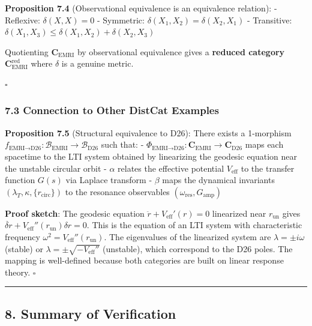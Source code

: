 \documentclass[
]{article}
\begin{document}
\textbf{Proposition 7.4} (Observational equivalence is an equivalence
relation): - Reflexive: \(\delta(X, X) = 0\) - Symmetric:
\(\delta(X_1, X_2) = \delta(X_2, X_1)\) - Transitive:
\(\delta(X_1, X_3) \leq \delta(X_1, X_2) + \delta(X_2, X_3)\)

Quotienting \(\mathbf{C}_{\text{EMRI}}\) by observational equivalence
gives a \textbf{reduced category}
\(\mathbf{C}_{\text{EMRI}}^{\text{red}}\) where \(\delta\) is a genuine
metric.

\(\square\)

\subsubsection{7.3 Connection to Other DistCat
Examples}\label{connection-to-other-distcat-examples}

\textbf{Proposition 7.5} (Structural equivalence to D26): There exists a
1-morphism
\(f_{\text{EMRI}\to\text{D26}}: \mathcal{B}_{\text{EMRI}} \to \mathcal{B}_{\text{D26}}\)
such that: -
\(\Phi_{\text{EMRI}\to\text{D26}}: \mathbf{C}_{\text{EMRI}} \to \mathbf{C}_{\text{D26}}\)
maps each spacetime to the LTI system obtained by linearizing the
geodesic equation near the unstable circular orbit - \(\alpha\) relates
the effective potential \(V_{\text{eff}}\) to the transfer function
\(G(s)\) via Laplace transform - \(\beta\) maps the dynamical invariants
\((\lambda_T, \kappa, \{r_{\text{circ}}\})\) to the resonance
observables \((\omega_{\text{res}}, G_{\text{amp}})\)

\textbf{Proof sketch}: The geodesic equation
\(\ddot{r} + V_{\text{eff}}'(r) = 0\) linearized near \(r_{\text{un}}\)
gives
\(\ddot{\delta r} + V_{\text{eff}}''(r_{\text{un}}) \delta r = 0\). This
is the equation of an LTI system with characteristic frequency
\(\omega^2 = V_{\text{eff}}''(r_{\text{un}})\). The eigenvalues of the
linearized system are \(\lambda = \pm i\omega\) (stable) or
\(\lambda = \pm \sqrt{-V_{\text{eff}}''}\) (unstable), which correspond
to the D26 poles. The mapping is well-defined because both categories
are built on linear response theory. \(\square\)

\begin{center}\rule{0.5\linewidth}{0.5pt}\end{center}

\subsection{8. Summary of Verification}\label{summary-of-verification}
\end{document}
